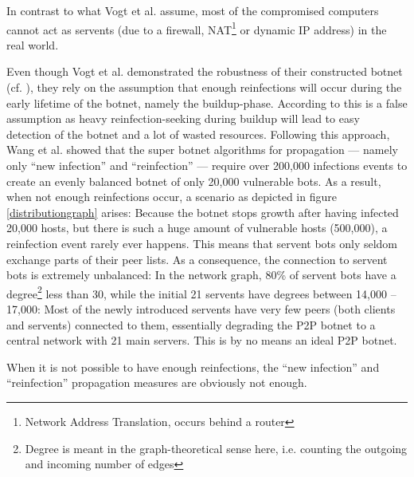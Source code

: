 \documentclass{llncs}
\begin{document}
\item \label{nat} In contrast to what Vogt et al. assume, most of the
  compromised computers cannot act as servents (due to a firewall,
  NAT\footnote{Network Address Translation, occurs behind a router}
  or dynamic IP address) in the real world.
\item Even though Vogt et al. demonstrated the robustness of their
  constructed botnet (cf. \cite{vogt2007army}), they rely on the
  assumption that enough reinfections will occur during the early
  lifetime of the botnet, namely the buildup-phase. According to
  \cite{td1sc} this is a false assumption as heavy reinfection-seeking
  during buildup will lead to easy detection of the botnet and a lot
  of wasted resources. Following this approach, Wang et al. showed
  that the super botnet algorithms for propagation --- namely only
  ``new infection'' and ``reinfection'' --- require over 200,000
  infections events to create an evenly balanced botnet of only 20,000
  vulnerable bots. As a result, when not enough reinfections occur, a
  scenario as depicted in figure \ref{distributiongraph} arises:
  Because the botnet stops growth after having infected 20,000 hosts,
  but there is such a huge amount of vulnerable hosts (500,000), a
  reinfection event rarely ever happens. This means that servent bots
  only seldom exchange parts of their peer lists. As a consequence,
  the connection to servent bots is extremely unbalanced: In the
  network graph, 80\% of servent bots have a degree\footnote{Degree is
    meant in the graph-theoretical sense here, i.e. counting the
    outgoing and incoming number of edges} less than 30, while the
  initial 21 servents have degrees between 14,000 -- 17,000: Most of
  the newly introduced servents have very few peers (both clients and
  servents) connected to them, essentially degrading the P2P botnet to
  a central network with 21 main servers. This is by no means an ideal
  P2P botnet.

When it is not possible to have enough reinfections, the ``new
infection'' and ``reinfection'' propagation measures are obviously not
enough.
\end{document}
